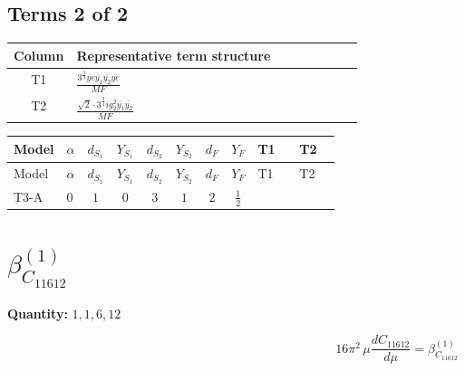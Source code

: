 \documentclass[8pt]{article}
\begin{document}
\begin{landscape}
\subsection*{Terms 2 of 2}
\begin{center}
\begin{tabular}{@{}c >{\raggedright\arraybackslash}p{0.82\linewidth}@{}}
\toprule
Column & Representative term structure \\
\midrule
T1 & \(\displaystyle \frac{3^{\frac{3}{4}} ye \overline{y_{1}} \overline{y_{2}} \overline{ye}}{MF}\) \\
\midrule
T2 & \(\displaystyle \frac{\sqrt{2} \cdot 3^{\frac{3}{4}} i g_{2}^{2} \overline{y_{1}} \overline{y_{2}}}{MF}\) \\
\midrule
\bottomrule
\end{tabular}
\end{center}
\smallskip
\tiny
\begin{longtable}{@{}llcccccc >{\raggedright\arraybackslash}p{0.21\linewidth} >{\raggedright\arraybackslash}p{0.21\linewidth}@{}}
\toprule
Model & $\alpha$ & $d_{S_1}$ & $Y_{S_1}$ & $d_{S_2}$ & $Y_{S_2}$ & $d_F$ & $Y_F$ & T1 & T2 \\
\midrule
\endfirsthead
\toprule
Model & $\alpha$ & $d_{S_1}$ & $Y_{S_1}$ & $d_{S_2}$ & $Y_{S_2}$ & $d_F$ & $Y_F$ & T1 & T2 \\
\midrule
\endhead
T3-A & $0$ & $1$ & $0$ & $3$ & $1$ & $2$ & $\frac{1}{2}$ & \scriptsize\adjustbox{max width=\linewidth}{$\begin{gathered} \frac{3^{\frac{3}{4}} ye \overline{y_{1}} \overline{y_{2}} \overline{ye}}{12 MF}\end{gathered}$} & \scriptsize\adjustbox{max width=\linewidth}{$\begin{gathered} - \frac{\sqrt{2} \cdot 3^{\frac{3}{4}} i g_{2}^{2} \overline{y_{1}} \overline{y_{2}}}{3 MF}\end{gathered}$} \\
\midrule
\bottomrule
\end{longtable}
\clearpage
\section*{$\beta_{C_{11612}}^{(1)}$}
\noindent\textbf{Quantity: }$\mathrm{1,1,6,12}$\par\smallskip
\[16\pi^2\,\mu\frac{d C_{11612}}{d\mu}=\beta_{C_{11612}}^{(1)}\]

\end{landscape}
\end{document}
